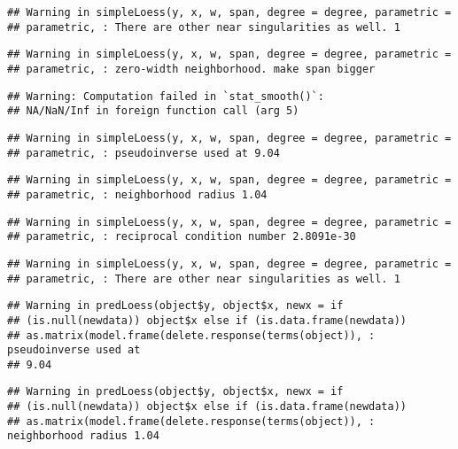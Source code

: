 \documentclass[
]{article}
\begin{document}
\begin{verbatim}
## Warning in simpleLoess(y, x, w, span, degree = degree, parametric =
## parametric, : There are other near singularities as well. 1
\end{verbatim}

\begin{verbatim}
## Warning in simpleLoess(y, x, w, span, degree = degree, parametric =
## parametric, : zero-width neighborhood. make span bigger
\end{verbatim}

\begin{verbatim}
## Warning: Computation failed in `stat_smooth()`:
## NA/NaN/Inf in foreign function call (arg 5)
\end{verbatim}

\begin{verbatim}
## Warning in simpleLoess(y, x, w, span, degree = degree, parametric =
## parametric, : pseudoinverse used at 9.04
\end{verbatim}

\begin{verbatim}
## Warning in simpleLoess(y, x, w, span, degree = degree, parametric =
## parametric, : neighborhood radius 1.04
\end{verbatim}

\begin{verbatim}
## Warning in simpleLoess(y, x, w, span, degree = degree, parametric =
## parametric, : reciprocal condition number 2.8091e-30
\end{verbatim}

\begin{verbatim}
## Warning in simpleLoess(y, x, w, span, degree = degree, parametric =
## parametric, : There are other near singularities as well. 1
\end{verbatim}

\begin{verbatim}
## Warning in predLoess(object$y, object$x, newx = if
## (is.null(newdata)) object$x else if (is.data.frame(newdata))
## as.matrix(model.frame(delete.response(terms(object)), : pseudoinverse used at
## 9.04
\end{verbatim}

\begin{verbatim}
## Warning in predLoess(object$y, object$x, newx = if
## (is.null(newdata)) object$x else if (is.data.frame(newdata))
## as.matrix(model.frame(delete.response(terms(object)), : neighborhood radius 1.04
\end{verbatim}
\end{document}
